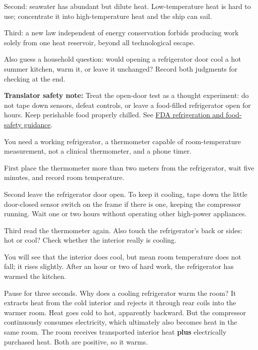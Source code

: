 Second: seawater has abundant but dilute heat. Low-temperature heat is hard to use; concentrate it into high-temperature heat and the ship can sail.

Third: a new law independent of energy conservation forbids producing work solely from one heat reservoir, beyond all technological escape.

Also guess a household question: would opening a refrigerator door cool a hot summer kitchen, warm it, or leave it unchanged? Record both judgments for checking at the end.


\begin{experiment}
\textbf{Translator safety note:} Treat the open-door test as a thought experiment: do not tape down sensors, defeat controls, or leave a food-filled refrigerator open for hours. Keep perishable food properly chilled. See \href{https://www.fda.gov/food/food-safety-during-emergencies/power-outages-key-tips-consumers-about-food-safety}{FDA refrigeration and food-safety guidance}.

You need a working refrigerator, a thermometer capable of room-temperature measurement, not a clinical thermometer, and a phone timer.

First place the thermometer more than two meters from the refrigerator, wait five minutes, and record room temperature.

Second leave the refrigerator door open. To keep it cooling, tape down the little door-closed sensor switch on the frame if there is one, keeping the compressor running. Wait one or two hours without operating other high-power appliances.

Third read the thermometer again. Also touch the refrigerator's back or sides: hot or cool? Check whether the interior really is cooling.

You will see that the interior does cool, but mean room temperature does not fall; it rises slightly. After an hour or two of hard work, the refrigerator has warmed the kitchen.
\end{experiment}

Pause for three seconds. Why does a cooling refrigerator warm the room? It extracts heat from the cold interior and rejects it through rear coils into the warmer room. Heat goes cold to hot, apparently backward. But the compressor continuously consumes electricity, which ultimately also becomes heat in the same room. The room receives transported interior heat \textbf{plus} electrically purchased heat. Both are positive, so it warms.

